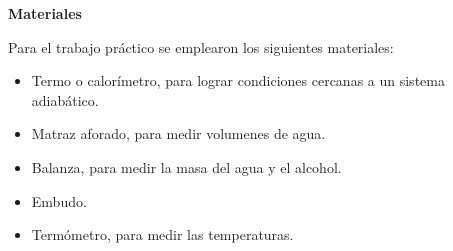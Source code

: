 \documentclass[11pt, letterpaper]{article}
\begin{document}
\begin{center}\textbf{Materiales}\end{center}
Para el trabajo práctico se emplearon los siguientes materiales:\\
\begin{itemize}
        \item Termo o calorímetro, para lograr condiciones cercanas a un sistema
                adiabático.
        \item Matraz aforado, para medir volumenes de agua.
        \item Balanza, para medir la masa del agua y el alcohol.
        \item Embudo.
        \item Termómetro, para medir las temperaturas.
\end{itemize}
                
\end{document}
